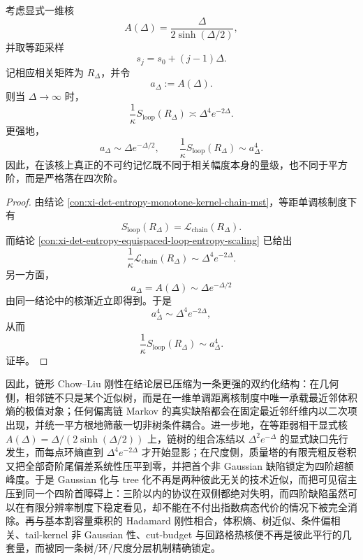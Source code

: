 \begin{theorem}[长距核的四次记忆律]\label{thm:conclusion-long-range-kernel-quartic-memory-law}
考虑显式一维核
\[
A(\Delta)=\frac{\Delta}{2\sinh(\Delta/2)},
\]
并取等距采样
\[
s_j=s_0+(j-1)\Delta.
\]
记相应相关矩阵为 \(R_\Delta\)，并令
\[
a_\Delta:=A(\Delta).
\]
则当 \(\Delta\to\infty\) 时，
\[
\frac{1}{\kappa}S_{\mathrm{loop}}(R_\Delta)\asymp \Delta^4e^{-2\Delta}.
\]
更强地，
\[
a_\Delta\sim \Delta e^{-\Delta/2},
\qquad
\frac{1}{\kappa}S_{\mathrm{loop}}(R_\Delta)\sim a_\Delta^4.
\]
因此，在该核上真正的不可约记忆既不同于相关幅度本身的量级，也不同于平方阶，而是严格落在四次阶。
\end{theorem}
\begin{proof}
由结论 \ref{con:xi-det-entropy-monotone-kernel-chain-mst}，等距单调核制度下有
\[
S_{\mathrm{loop}}(R_\Delta)=\mathcal L_{\mathrm{chain}}(R_\Delta).
\]
而结论 \ref{con:xi-det-entropy-equispaced-loop-entropy-scaling} 已给出
\[
\frac{1}{\kappa}\mathcal L_{\mathrm{chain}}(R_\Delta)\sim \Delta^4e^{-2\Delta}.
\]
另一方面，
\[
a_\Delta=A(\Delta)\sim \Delta e^{-\Delta/2}
\]
由同一结论中的核渐近立即得到。于是
\[
a_\Delta^4\sim \Delta^4e^{-2\Delta},
\]
从而
\[
\frac{1}{\kappa}S_{\mathrm{loop}}(R_\Delta)\sim a_\Delta^4.
\]
证毕。
\end{proof}







\noindent
因此，链形 Chow--Liu 刚性在结论层已压缩为一条更强的双约化结构：在几何侧，相邻链不只是某个近似树，而是在一维单调距离核制度中唯一承载最近邻体积熵的极值对象；任何偏离链 Markov 的真实缺陷都会在固定最近邻纤维内以二次项出现，并统一平方根地筛蔽一切非树条件耦合。进一步地，在等距弱相干显式核 \(A(\Delta)=\Delta/(2\sinh(\Delta/2))\) 上，链树的组合冻结以 \(\Delta^2e^{-\Delta}\) 的显式缺口先行发生，而每点环熵直到 \(\Delta^4e^{-2\Delta}\) 才开始显影；在尺度侧，质量塔的有限壳粗反卷积又把全部奇阶尾偏差系统性压平到零，并把首个非 Gaussian 缺陷锁定为四阶超额峰度。于是 Gaussian 化与 tree 化不再是两种彼此无关的技术近似，而把可见宿主压到同一个四阶首障碍上：三阶以内的协议在双侧都绝对失明，而四阶缺陷虽然可以在有限分辨率制度下稳定看见，却不能在不付出指数病态代价的情况下被完全消除。再与基本割容量乘积的 Hadamard 刚性相合，体积熵、树近似、条件偏相关、tail-kernel 非 Gaussian 性、cut-budget 与回路格热核便不再是彼此平行的几套量，而被同一条树/环/尺度分层机制精确锁定。

\endinput
